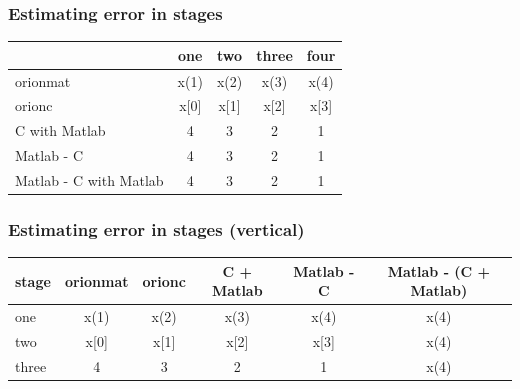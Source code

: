 \documentclass{beamer}
\begin{document}
\begin{frame}\frametitle{Estimating error in stages}
        \centering
	\begin{tabular}{|p{2cm}|c|c|c|c|}
		\toprule
                                         & one                    & two                    & three                  & four                   \\%
		\midrule
                  \hline
                  \gls{orionmat}         & \cellcolor{langM} x(1) & \cellcolor{langM} x(2) & \cellcolor{langM} x(3) & \cellcolor{langM} x(4) \\%
                  \gls{orionc}           & \cellcolor{langC} x[0] & \cellcolor{langC} x[1] & \cellcolor{langC} x[2] & \cellcolor{langC} x[3] \\%
                  C with Matlab          & \cellcolor{langCM} 4   & \cellcolor{langCM} 3   & \cellcolor{langCM} 2   & \cellcolor{langCM} 1   \\%

                  Matlab - C             & \cellcolor{diffone} 4  & \cellcolor{diffone} 3  & \cellcolor{diffone} 2  & \cellcolor{diffone} 1  \\%
                  Matlab - C with Matlab & \cellcolor{difftwo} 4  & \cellcolor{difftwo} 3  & \cellcolor{difftwo} 2  & \cellcolor{difftwo} 1  \\%
		  \bottomrule
        \end{tabular}
\end{frame}



\begin{frame}\frametitle{Estimating error in stages (vertical)}
        \centering
        \begin{tabular}{|l|c|c|c|c|c|}
		stage  & \gls{orionmat}         & \gls{orionc}           & C + Matlab           & Matlab - C               & Matlab - (C + Matlab)   \\ \midrule
		one    & \cellcolor{langM} x(1) & \cellcolor{langC} x(2) & \cellcolor{langCM} x(3) & \cellcolor{diffone} x(4) & \cellcolor{difftwo} x(4) \\ \hline
		two    & \cellcolor{langM} x[0] & \cellcolor{langC} x[1] & \cellcolor{langCM} x[2] & \cellcolor{diffone} x[3] & \cellcolor{difftwo} x(4) \\ \hline
		three  & \cellcolor{langM} 4    & \cellcolor{langC} 3    & \cellcolor{langCM} 2    & \cellcolor{diffone} 1    & \cellcolor{difftwo} x(4) \\ \hline

        \end{tabular}
        \note{
        }
\end{frame}
\end{document}
